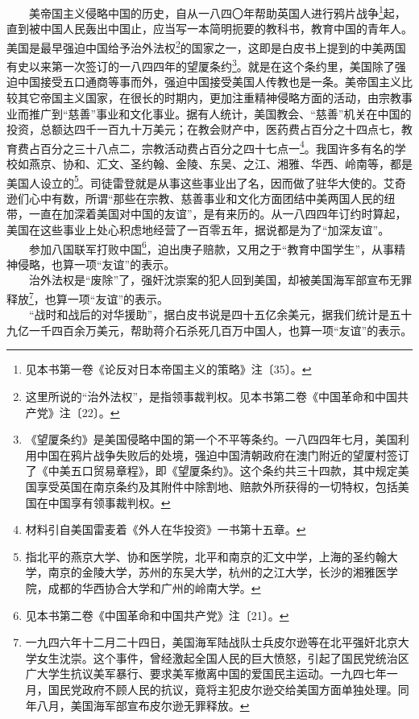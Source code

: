\documentclass[cn,11pt,chinese]{elegantbook}
\begin{document}
　　美帝国主义侵略中国的历史，自从一八四〇年帮助英国人进行鸦片战争\footnote[1]{ 见本书第一卷《论反对日本帝国主义的策略》注〔35〕。}起，直到被中国人民轰出中国止，应当写一本简明扼要的教科书，教育中国的青年人。美国是最早强迫中国给予治外法权\footnote[2]{ 这里所说的“治外法权”，是指领事裁判权。见本书第二卷《中国革命和中国共产党》注〔22〕。}的国家之一，这即是白皮书上提到的中美两国有史以来第一次签订的一八四四年的望厦条约\footnote[3]{ 《望厦条约》是美国侵略中国的第一个不平等条约。一八四四年七月，美国利用中国在鸦片战争失败后的处境，强迫中国清朝政府在澳门附近的望厦村签订了《中美五口贸易章程》，即《望厦条约》。这个条约共三十四款，其中规定美国享受英国在南京条约及其附件中除割地、赔款外所获得的一切特权，包括美国在中国享有领事裁判权。}。就是在这个条约里，美国除了强迫中国接受五口通商等事而外，强迫中国接受美国人传教也是一条。美帝国主义比较其它帝国主义国家，在很长的时期内，更加注重精神侵略方面的活动，由宗教事业而推广到“慈善”事业和文化事业。据有人统计，美国教会、“慈善”机关在中国的投资，总额达四千一百九十万美元；在教会财产中，医药费占百分之十四点七，教育费占百分之三十八点二，宗教活动费占百分之四十七点一\footnote[4]{ 材料引自美国雷麦着《外人在华投资》一书第十五章。}。我国许多有名的学校如燕京、协和、汇文、圣约翰、金陵、东吴、之江、湘雅、华西、岭南等，都是美国人设立的\footnote[5]{ 指北平的燕京大学、协和医学院，北平和南京的汇文中学，上海的圣约翰大学，南京的金陵大学，苏州的东吴大学，杭州的之江大学，长沙的湘雅医学院，成都的华西协合大学和广州的岭南大学。}。司徒雷登就是从事这些事业出了名，因而做了驻华大使的。艾奇逊们心中有数，所谓“那些在宗教、慈善事业和文化方面团结中美两国人民的纽带，一直在加深着美国对中国的友谊”，是有来历的。从一八四四年订约时算起，美国在这些事业上处心积虑地经营了一百零五年，据说都是为了“加深友谊”。\\
　　参加八国联军打败中国\footnote[6]{ 见本书第二卷《中国革命和中国共产党》注〔21〕。}，迫出庚子赔款，又用之于“教育中国学生”，从事精神侵略，也算一项“友谊”的表示。\\
　　治外法权是“废除”了，强奸沈崇案的犯人回到美国，却被美国海军部宣布无罪释放\footnote[7]{ 一九四六年十二月二十四日，美国海军陆战队士兵皮尔逊等在北平强奸北京大学女生沈崇。这个事件，曾经激起全国人民的巨大愤怒，引起了国民党统治区广大学生抗议美军暴行、要求美军撤离中国的爱国民主运动。一九四七年一月，国民党政府不顾人民的抗议，竟将主犯皮尔逊交给美国方面单独处理。同年八月，美国海军部宣布皮尔逊无罪释放。}，也算一项“友谊”的表示。\\
　　“战时和战后的对华援助”，据白皮书说是四十五亿余美元，据我们统计是五十九亿一千四百余万美元，帮助蒋介石杀死几百万中国人，也算一项“友谊”的表示。\\
\end{document}
